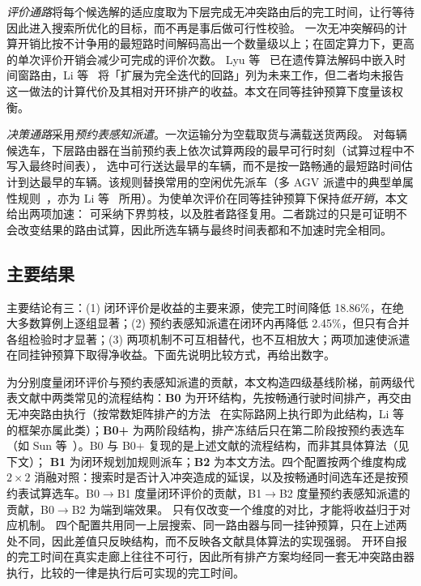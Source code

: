 \documentclass[manuscript,screen,review]{acmart}
\newcommand{\GainLoopRule}{18.86\%}      %
\newcommand{\GainProbeLoop}{2.45\%}      %
\begin{document}
\emph{评价通路}将每个候选解的适应度取为下层完成无冲突路由后的完工时间，让行等待因此进入搜索所优化的目标，而不再是事后做可行性校验。
一次无冲突解码的计算开销比按不计争用的最短路时间解码高出一个数量级以上；在固定算力下，更高的单次评价开销会减少可完成的评价次数。
Lyu 等~\cite{lyu2019approach} 已在遗传算法解码中嵌入时间窗路由，Li 等~\cite{li2026framework} 将「扩展为完全迭代的回路」列为未来工作，但二者均未报告这一做法的计算代价及其相对开环排产的收益。本文在同等挂钟预算下度量该权衡。

\emph{决策通路}采用\emph{预约表感知派遣}。一次运输分为空载取货与满载送货两段。
对每辆候选车，下层路由器在当前预约表上依次试算两段的最早可行时刻（试算过程中不写入最终时间表），
选中可行送达最早的车辆，而不是按一路畅通的最短路时间估计到达最早的车辆。该规则替换常用的空闲优先派车（多 AGV 派遣中的典型单属性规则~\cite{lu2022agv}，亦为 Li 等~\cite{li2026framework} 所用）。为使单次评价在同等挂钟预算下保持\emph{低开销}，本文给出两项加速：
可采纳下界剪枝，以及胜者路径复用。二者跳过的只是可证明不会改变结果的路由试算，因此所选车辆与最终时间表都和不加速时完全相同。


\subsection{主要结果}

主要结论有三：(1) 闭环评价是收益的主要来源，使完工时间降低 \GainLoopRule{}，在绝大多数算例上逐组显著；(2) 预约表感知派遣在闭环内再降低 \GainProbeLoop{}，但只有合并各组检验时才显著；(3) 两项机制不可互相替代，也不互相放大；两项加速使派遣在同挂钟预算下取得净收益。下面先说明比较方式，再给出数字。

为分别度量闭环评价与预约表感知派遣的贡献，本文构造四级基线阶梯，前两级代表文献中两类常见的流程结构：\textbf{B0} 为开环结构，先按畅通行驶时间排产，再交由无冲突路由执行（按常数矩阵排产的方法~\cite{meng2025cp,qin2026knowledge,jafarian2026integrated} 在实际路网上执行即为此结构，Li 等~\cite{li2026framework} 的框架亦属此类）；\textbf{B0+} 为两阶段结构，排产冻结后只在第二阶段按预约表选车（如 Sun 等~\cite{sun2023integrated}）。B0 与 B0+ 复现的是上述文献的流程结构，而非其具体算法（见下文）；
\textbf{B1} 为闭环规划加规则派车；\textbf{B2} 为本文方法。四个配置按两个维度构成 $2\times2$ 消融对照：搜索时是否计入冲突造成的延误，以及按畅通时间选车还是按预约表试算选车。B0$\to$B1 度量闭环评价的贡献，B1$\to$B2 度量预约表感知派遣的贡献，B0$\to$B2 为端到端效果。
只有仅改变一个维度的对比，才能将收益归于对应机制。
四个配置共用同一上层搜索、同一路由器与同一挂钟预算，只在上述两处不同，因此差值只反映结构，而不反映各文献具体算法的实现强弱。
开环自报的完工时间在真实走廊上往往不可行，因此所有排产方案均经同一套无冲突路由器执行，比较的一律是执行后可实现的完工时间。
\end{document}
